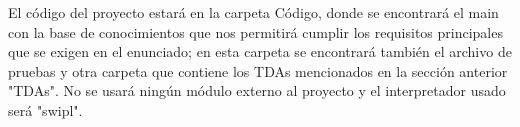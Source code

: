 El código del proyecto estará en la carpeta Código, donde se encontrará el main con la base de conocimientos que nos permitirá cumplir los
requisitos principales que se exigen en el enunciado; en esta carpeta se encontrará también el archivo de pruebas y otra carpeta que contiene los TDAs
 mencionados en la sección anterior "TDAs". No se usará ningún módulo externo al proyecto y el interpretador usado será "swipl".